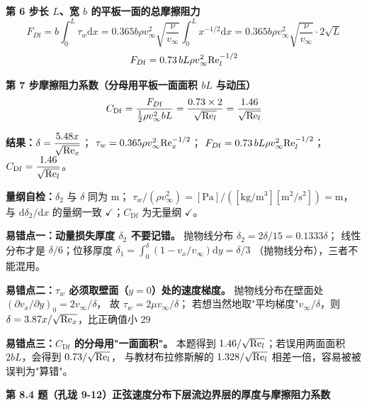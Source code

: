 \begin{jie}
\textbf{第 6 步\quad 长 $L$、宽 $b$ 的平板一面的总摩擦阻力}
\[ F_{D\mathrm{f}}=b\int_0^{L}\tau_w\mathrm{d}x
=0.365b\rho v_\infty^{2}\sqrt{\frac{\nu}{v_\infty}}\int_0^{L}x^{-1/2}\mathrm{d}x
=0.365b\rho v_\infty^{2}\sqrt{\frac{\nu}{v_\infty}}\cdot2\sqrt{L} \]
\[ F_{D\mathrm{f}}=0.73\,bL\rho v_\infty^{2}\mathrm{Re}_l^{-1/2} \]

\textbf{第 7 步\quad 摩擦阻力系数（分母用平板一面面积 $bL$ 与动压）}
\[ C_{\mathrm{Df}}=\frac{F_{D\mathrm{f}}}{\frac{1}{2}\rho v_\infty^{2}bL}
=\frac{0.73\times2}{\sqrt{\mathrm{Re}_l}}=\frac{1.46}{\sqrt{\mathrm{Re}_l}} \]

\textbf{结果：}$\delta=\dfrac{5.48x}{\sqrt{\mathrm{Re}_x}}$；
$\tau_w=0.365\rho v_\infty^{2}\mathrm{Re}_x^{-1/2}$；
$F_{D\mathrm{f}}=0.73\,bL\rho v_\infty^{2}\mathrm{Re}_l^{-1/2}$；
$C_{\mathrm{Df}}=\dfrac{1.46}{\sqrt{\mathrm{Re}_l}}$。

\textbf{量纲自检：}$\delta_2$ 与 $\delta$ 同为 $\mathrm{m}$；
$\tau_w/(\rho v_\infty^{2})=[\mathrm{Pa}]/([\mathrm{kg/m^3}][\mathrm{m^2/s^2}])=\mathrm{m}$，
与 $\mathrm{d}\delta_2/\mathrm{d}x$ 的量纲一致 $\checkmark$；$C_{\mathrm{Df}}$ 为无量纲 $\checkmark$。
\end{jie}

\begin{yicuo}
\textbf{易错点一：动量损失厚度 $\delta_2$ 不要记错。}
抛物线分布 $\delta_2=2\delta/15=0.1333\delta$；
线性分布才是 $\delta/6$；位移厚度 $\delta_1=\int_0^{\delta}(1-v_x/v_\infty)\mathrm{d}y=\delta/3$
（抛物线分布），三者不能混用。

\textbf{易错点二：$\tau_w$ 必须取壁面（$y=0$）处的速度梯度。}
抛物线分布在壁面处 $\left(\partial v_x/\partial y\right)_0=2v_\infty/\delta$，
故 $\tau_w=2\mu v_\infty/\delta$；
若想当然地取"平均梯度"$v_\infty/\delta$，则 $\delta=3.87x/\sqrt{\mathrm{Re}_x}$，比正确值小 29%

\textbf{易错点三：$C_{\mathrm{Df}}$ 的分母用"一面面积"。}
本题得到 $1.46/\sqrt{\mathrm{Re}_l}$；若误用两面面积 $2bL$，会得到 $0.73/\sqrt{\mathrm{Re}_l}$，
与教材布拉修斯解的 $1.328/\sqrt{\mathrm{Re}_l}$ 相差一倍，容易被被误判为"算错"。
\end{yicuo}

\noindent\textbf{第 8.4 题（孔珑 9-12）\quad 正弦速度分布下层流边界层的厚度与摩擦阻力系数}

